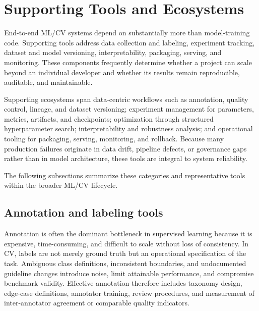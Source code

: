 \documentclass{article}
\begin{document}
\clearpage




\section{Supporting Tools and Ecosystems}

End-to-end ML/CV systems depend on substantially more than model-training code. Supporting tools address data collection and labeling, experiment tracking, dataset and model versioning, interpretability, packaging, serving, and monitoring. These components frequently determine whether a project can scale beyond an individual developer and whether its results remain reproducible, auditable, and maintainable.

Supporting ecosystems span data-centric workflows such as annotation, quality control, lineage, and dataset versioning; experiment management for parameters, metrics, artifacts, and checkpoints; optimization through structured hyperparameter search; interpretability and robustness analysis; and operational tooling for packaging, serving, monitoring, and rollback. Because many production failures originate in data drift, pipeline defects, or governance gaps rather than in model architecture, these tools are integral to system reliability.

The following subsections summarize these categories and representative tools within the broader ML/CV lifecycle.


\subsection{Annotation and labeling tools}

Annotation is often the dominant bottleneck in supervised learning because it is expensive, time-consuming, and difficult to scale without loss of consistency. In CV, labels are not merely ground truth but an operational specification of the task. Ambiguous class definitions, inconsistent boundaries, and undocumented guideline changes introduce noise, limit attainable performance, and compromise benchmark validity. Effective annotation therefore includes taxonomy design, edge-case definitions, annotator training, review procedures, and measurement of inter-annotator agreement or comparable quality indicators.
\end{document}

